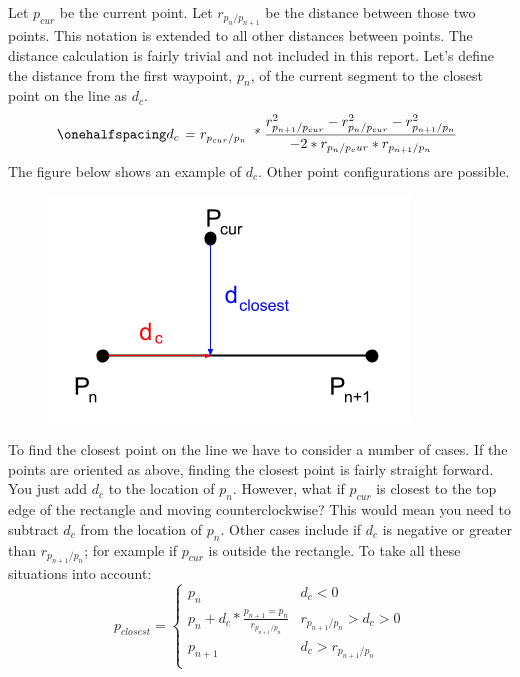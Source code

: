 \documentclass[12pt]{article}
\begin{document}
Let \textit{$p_{cur}$} be the current point. Let \textit{$r_{p_n/p_{n+1}}$} be the distance between those two points. This notation is extended to all other distances between points. The distance calculation is fairly trivial and not included in this report. Let's define the distance from the first waypoint, \textit{$p_n$}, of the current segment to the closest point on the line as \textit{$d_c$}. 
\begin{equation}
\onehalfspacing
\centering
\emph{$d_c$ = $r_{p_{cur}/p_n}$ * $\frac{r_{p_{n+1}/p_{cur}}^2 -  r_{p_n/p_{cur}}^2 - r_{p_{n+1}/p_n}^2}{-2*r_{p_n/p_cur}*r_{p_{n+1}/p_n}}$ }
\end{equation}
The figure below shows an example of \textit{$d_c$}. Other point configurations are possible. 
\begin{figure}[ht]
\hspace{0.5cm}
\centering
\includegraphics[scale=0.5]{Pictures/points_1.png}
\end{figure}
To find the closest point on the line we have to consider a number of cases. If the points are oriented as above, finding the closest point is fairly straight forward. You just add  \textit{$d_c$} to the location of \textit{$p_n$}. However, what if  \textit{$p_{cur}$} is closest to the top edge of the rectangle and moving counterclockwise? This would mean you need to subtract  \textit{$d_c$} from the location of \textit{$p_n$}. Other cases include if \textit{$d_c$} is negative or greater than \textit{$r_{p_{n+1}/p_n}$}; for example if \textit{$p_{cur}$} is outside the rectangle. To take all these situations into account:
\[ 
      p_{closest} = 
      \begin{cases} 
      p_n & d_c < 0\\
      p_n + d_c * \frac{p_{n+1} = p_n}{r_{p_{n+1}/p_n}} & r_{p_{n+1}/p_n} > d_c > 0 \\
      p_{n+1} & d_c > r_{p_{n+1}/p_n}\\
   \end{cases}
\]
\end{document}
